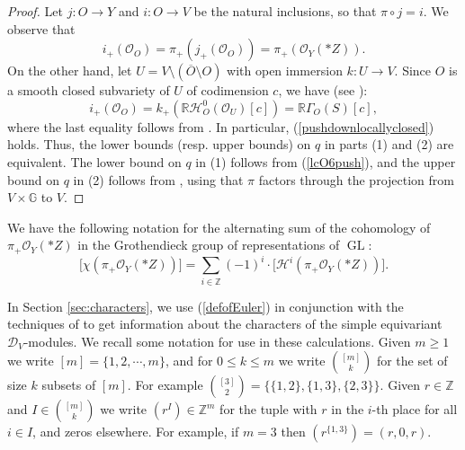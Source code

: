 \documentclass[11pt,reqno]{amsart}
\newcommand{\D}{\mathcal{D}}
\newcommand{\GL}{\operatorname{GL}}
\newcommand{\bb}[1]{\mathbb{#1}}
\newcommand{\mc}[1]{\mathcal{#1}}
\newcommand{\ol}[1]{\overline{#1}}
\numberwithin{equation}{section}
\begin{document}
\begin{proof}
Let $j:O\to Y$ and $i:O\to V$ be the natural inclusions, so that $\pi\circ j=i$. We observe that
$$
i_{+}(\mathcal{O}_{O})=\pi_{+}(j_{+}(\mathcal{O}_{O}))=\pi_{+}(\mathcal{O}_Y(\ast Z)).
$$
On the other hand, let $U=V\setminus (\ol{O}\setminus O)$ with open immersion $k:U\to V$. Since $O$ is a smooth closed subvariety of $U$ of codimension $c$, we have (see \cite[Proposition 1.7.1]{htt}):
\begin{equation}\label{lcO6push}
i_{+}(\mathcal{O}_{O})=k_{+}(\mathbb{R}\mathscr{H}^0_{O}(\mc{O}_U)[c])=\mathbb{R}\Gamma_{O}(S)[c],
\end{equation}
where the last equality follows from \cite[Proposition 1.3, Proposition 1.4]{hartshornelocal}.
In particular, (\ref{pushdownlocallyclosed}) holds. Thus, the lower bounds (resp. upper bounds) on $q$ in parts (1) and (2) are equivalent. The lower bound on $q$ in (1) follows from (\ref{lcO6push}), and the upper bound on $q$ in (2) follows from \cite[Proposition 1.5.28(ii)]{htt}, using that $\pi$ factors through the projection from $V\times \bb{G}$ to $V$. 
\end{proof}

We have the following notation for the alternating sum of the cohomology of $\pi_+\mc{O}_Y(\ast Z)$ in the Grothendieck group of representations of $\GL$:
\begin{equation}\label{defofEuler}
\big[\chi(\pi_+\mc{O}_Y(\ast Z))\big]=\sum_{i\in \mathbb{Z}} (-1)^i \cdot \big[\mc{H}^i(\pi_+\mc{O}_Y(\ast Z))\big].
\end{equation}

In Section \ref{sec:characters}, we use (\ref{defofEuler}) in conjunction with the techniques of \cite[Section 2]{raicu2016characters} to get information about the characters of the simple equivariant $\D_V$-modules. We recall some notation for use in these calculations. Given $m\geq 1$ we write $[m]=\{1,2,\cdots, m\}$, and for $0\leq k\leq m$ we write $\binom{[m]}{k}$ for the set of size $k$ subsets of $[m]$. For example $\binom{[3]}{2}=\{\{1,2\},\{1,3\},\{2,3\}\}$. Given $r\in \mathbb{Z}$ and $I\in \binom{[m]}{k}$ we write $(r^I)\in \mathbb{Z}^m$ for the tuple with $r$ in the $i$-th place for all $i\in I$, and zeros elsewhere. For example, if $m=3$ then $(r^{\{1,3\}})=(r,0,r)$. 
\end{document}
